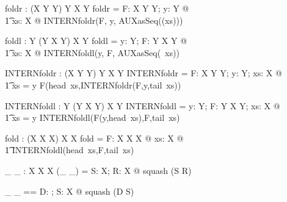 \documentclass{article}
\begin{document}

\begin{axdef}[X,Y]
  foldr : \assumed (X \cross Y \pfun Y) \cross Y  \fun \seq X \pfun Y
\where
  foldr = \lambda F: \assumed X \cross Y \pfun Y; y: Y @ \\\t1
           \lambda xs: \seq X @ INTERNfoldr(F, y, AUXasSeq(\DEEPFORCE(xs)))
\end{axdef}

\begin{axdef}[X,Y]
  foldl : \assumed Y \cross (Y \cross X \pfun Y)  \fun \seq X \pfun Y
\where
  foldl = \lambda y: Y; F: \assumed Y \cross X \pfun Y @ \\\t1
           \lambda xs: \seq X @ INTERNfoldl(y, F, AUXasSeq(\DEEPFORCE~xs))
\end{axdef}

\begin{axdef}[X,Y]
  INTERNfoldr : \assumed (X \cross Y \pfun Y) \cross Y \cross \seq X \pfun Y
\where
  INTERNfoldr =
    \lambda F: \assumed X \cross Y \pfun Y; y: Y; xs: \assumed \seq X @ \\\t1
      \IF xs = \emptyset \THEN y
                         \ELSE F(head~xs,INTERNfoldr(F,y,tail~xs))
\end{axdef}

\begin{axdef}[X,Y]
  INTERNfoldl : \assumed Y \cross (Y \cross X \pfun Y) \cross \seq X \pfun Y
\where
  INTERNfoldl =
    \lambda y: Y; F: \assumed Y \cross X \pfun Y; xs: \assumed \seq X @ \\\t1
      \IF xs = \emptyset \THEN y
                         \ELSE INTERNfoldl(F(y,head~xs),F,tail~xs)
\end{axdef}

\begin{axdef}[X]
  fold : \assumed (X \cross X \pfun X) \fun \seq X \pfun X
\where
  fold =
    \lambda F: \assumed X \cross X \pfun X @
    \lambda xs: \assumed \seq X @ \\\t1
      INTERNfoldl(head~xs,F,tail~xs)
\end{axdef}



\begin{axdef}[X]
   \_ \filter \_ : \assumed \seq X \cross \power X \fun \seq X 
\where
   (\_ \filter \_) = \lambda S: \assumed \seq X; R: \assumed \power X @
     squash (S \rres R)
\end{axdef}
   
\begin{axdef}[X]
   \_ \extract \_ == 
      \lambda D: \assumed \power \nat; S: \assumed \seq X @
        squash (D \dres S)
\end{axdef}
\end{document}
